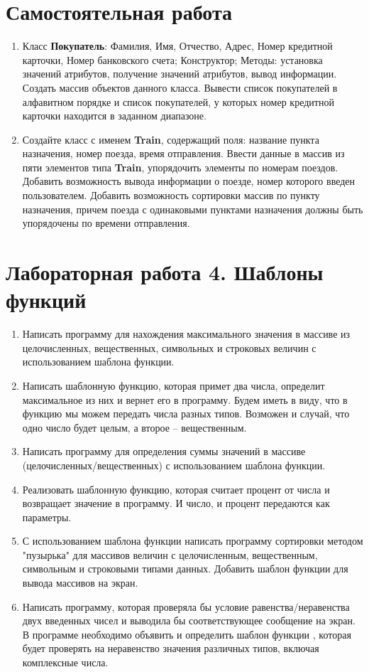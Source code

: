 \section{Самостоятельная работа}
\begin{enumerate}[leftmargin=*]
    \item Класс \textbf{Покупатель}: Фамилия, Имя, Отчество, Адрес, Номер кредитной карточки, Номер банковского счета; Конструктор; Методы: установка значений атрибутов, получение значений атрибутов, вывод информации. Создать массив объектов данного класса. Вывести список покупателей в алфавитном порядке и список покупателей, у которых номер кредитной карточки находится в заданном диапазоне.
    \item Создайте класс с именем \textbf{Train}, содержащий поля: название пункта назначения, номер поезда, время отправления. Ввести данные в массив из пяти элементов типа \textbf{Train}, упорядочить элементы по номерам поездов. Добавить возможность вывода информации о поезде, номер которого введен пользователем. Добавить возможность сортировки массив по пункту назначения, причем поезда с одинаковыми пунктами назначения должны быть упорядочены по времени отправления. 
\end{enumerate}

\section{Лабораторная работа 4. Шаблоны функций}
\begin{enumerate}[leftmargin=*]
    \item Написать программу для нахождения максимального значения в массиве из целочисленных, вещественных, символьных и строковых величин с использованием шаблона функции.
    \item Написать шаблонную функцию, которая примет два числа, определит максимальное из них и вернет его в программу. Будем иметь в виду, что в функцию мы можем передать числа разных типов. Возможен и случай, что одно число будет целым, а второе – вещественным.
    \item Написать программу для определения суммы значений в массиве (целочисленных/вещественных) с использованием шаблона функции.
    \item Реализовать шаблонную функцию, которая считает процент от числа и возвращает значение в программу. И число, и процент передаются как параметры.
    \item С использованием шаблона функции написать программу сортировки методом "пузырька" для массивов величин с  целочисленным, вещественным, символьным и строковыми типами данных. Добавить шаблон функции для вывода массивов на экран.
    \item Написать программу, которая проверяла бы условие равенства/неравенства двух введенных чисел и выводила бы соответствующее сообщение на экран. В программе необходимо объявить и определить шаблон функции , которая будет проверять на неравенство значения различных типов, включая комплексные числа.
\end{enumerate}

